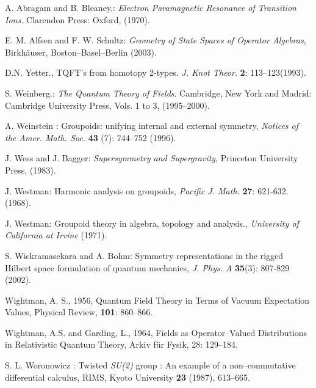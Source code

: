 \documentclass[12pt]{article}
\begin{document}
\begin{thebibliography}{9}

A. Abragam and B. Bleaney.: {\em Electron Paramagnetic Resonance of Transition Ions.}
Clarendon Press: Oxford, (1970).

E. M. Alfsen and F. W. Schultz: \emph{Geometry of State Spaces of
Operator Algebras}, Birkh\"auser, Boston--Basel--Berlin (2003).

D.N. Yetter., TQFT's from homotopy 2-types. \textit{J. Knot Theor}. \textbf{2}: 113--123(1993).

S. Weinberg.:  \emph{The Quantum Theory of Fields}. Cambridge, New York and Madrid:
Cambridge University Press, Vols. 1 to 3, (1995--2000).

A. Weinstein : Groupoids: unifying internal and external symmetry,
\emph{Notices of the Amer. Math. Soc.} \textbf{43} (7): 744--752 (1996).

J. Wess and J. Bagger: \emph{Supersymmetry and Supergravity},
Princeton University Press, (1983).

J. Westman: Harmonic analysis on groupoids, \textit{Pacific J. Math.} \textbf{27}: 621-632. (1968).

J. Westman: Groupoid theory in algebra, topology and analysis., \textit{University of California at Irvine} (1971).

S. Wickramasekara and A. Bohm: Symmetry representations in the rigged Hilbert space formulation of quantum mechanics, \emph{J. Phys. A} \textbf{35}(3): 807-829 (2002).

Wightman, A. S., 1956, Quantum Field Theory in Terms of Vacuum Expectation Values, Physical Review, \textbf{101}: 860--866.

Wightman, A.S. and Garding, L., 1964, Fields as Operator--Valued Distributions in Relativistic Quantum Theory, Arkiv f\"ur Fysik, 28: 129--184.

S. L. Woronowicz : Twisted {\em SU(2)} group : An example of a non--commutative differential calculus, RIMS, Kyoto University \textbf{23} (1987), 613--665.

\end{thebibliography}
\end{document}
